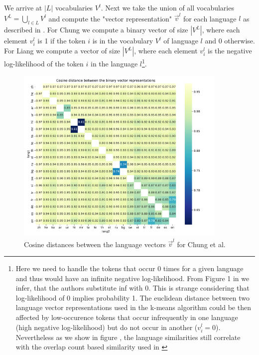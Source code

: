 We arrive at $|L|$ vocabularies $V^l$. Next we take the union of all vocabularies $V^L = \bigcup_{l \in L} V^l$ and compute the "vector representation" $\vec{v}^l$ for each language $l$ as described in . For Chung we compute a binary vector of size $|V^L|$, where each element $v^l_i$ is 1 if the token $i$ is in the vocabulary $V^l$ of language $l$ and 0 otherwise. For Liang we compute a vector of size $|V^L|$, where each element $v^l_i$ is the negative log-likelihood of the token $i$ in the language $l$\footnote{Here we need to handle the tokens that occur 0 times for a given language and thus would have an infinite negative log-likelihood. From Figure 1 in \cite{liang_xlm-v_2023} we infer, that the authors substitute inf with 0. This is strange considering that log-likelihood of 0 implies probability 1. The euclidean distance between two language vector representations used in the k-means algorithm could be then affected by low-occurence tokens that occur infrequently in one language (high negative log-likelihood) but do not occur in another ($v^l_i = 0$). Nevertheless as we show in figure , the language similarities still correlate with the overlap count based similarity used in \cite{chung_improving_2020}}.



\begin{figure}[h]
    \centering
    \includegraphics[width=0.9\textwidth]{figures/chung_distances.pdf}
    \caption{Cosine distances between the language vectors $\vec{v}^l$ for Chung et al.}
    \label{fig:chung_distances}
\end{figure}

